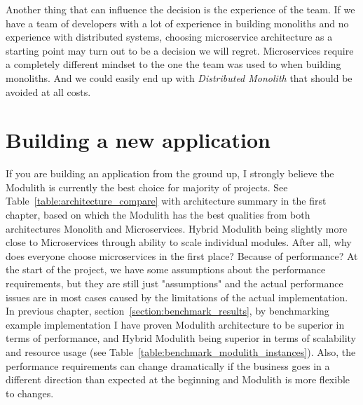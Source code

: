 Another thing that can influence the decision is the experience of the team. If we have a team of developers with a lot of experience in building monoliths and no experience with distributed systems, choosing microservice architecture as a starting point may turn out to be a decision we will regret. Microservices require a completely different mindset to the one the team was used to when building monoliths. And we could easily end up with \textit{Distributed Monolith} that should be avoided at all costs.

\section{Building a new application}
If you are building an application from the ground up, I strongly believe the Modulith is currently the best choice for majority of projects. See Table~\ref{table:architecture_compare} with architecture summary in the first chapter, based on which the Modulith has the best qualities from both architectures Monolith and Microservices. Hybrid Modulith being slightly more close to Microservices through ability to scale individual modules. After all, why does everyone choose microservices in the first place? Because of performance? At the start of the project, we have some assumptions about the performance requirements, but they are still just "assumptions" and the actual performance issues are in most cases caused by the limitations of the actual implementation. In previous chapter, section~\ref{section:benchmark_results}, by benchmarking example implementation I have proven Modulith architecture to be superior in terms of performance, and Hybrid Modulith being superior in terms of scalability and resource usage (see Table~\ref{table:benchmark_modulith_instances}). Also, the performance requirements can change dramatically if the business goes in a different direction than expected at the beginning and Modulith is more flexible to changes.

